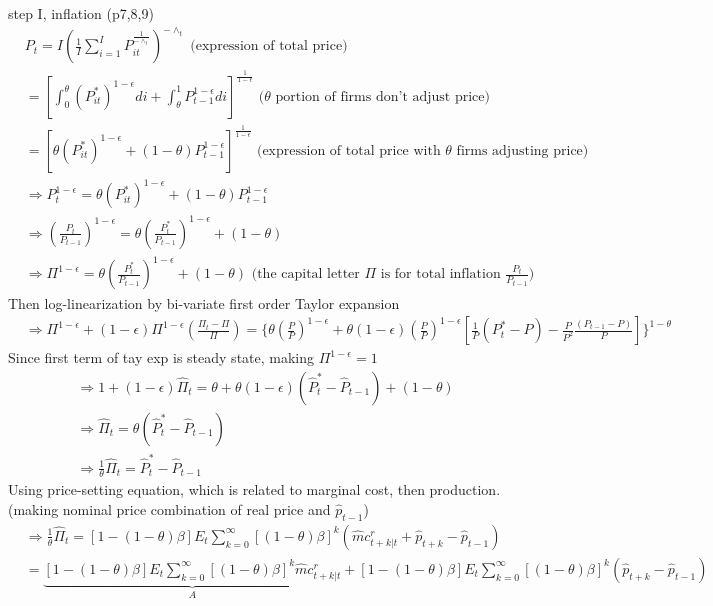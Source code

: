 \documentclass{article}
\begin{document}
step I, inflation (p7,8,9)
\begin{align}
& P_{t}=I(\frac{1}{I}\sum\limits_{i=1}^{I}P_{it}^\frac{1}{-\wedge_t})^{-\wedge_t}\text{ (expression of total price)}
\\& =[\int_{0}^{\theta} (P^{*}_{it})^{1-\epsilon}di+\int_{\theta}^{1} P_{t-1}^{1-\epsilon}di]^{ \frac{1}{1-\epsilon}}
\text{ ($\theta$ portion of firms don't adjust price)}
\\& =[\theta (P^{*}_{it})^{1-\epsilon}+(1-\theta) P_{t-1}^{1-\epsilon}]^{ \frac{1}{1-\epsilon}}
\text{ (expression of total price with $\theta$ firms adjusting price)}
\\& \Rightarrow P_t^{1-\epsilon}=\theta (P^{*}_{it})^{1-\epsilon}+(1-\theta) P_{t-1}^{1-\epsilon}
\\& \Rightarrow (\frac{P_t}{P_{t-1}})^{1-\epsilon}=\theta (\frac{P_t^*}{P_{t-1}})^{1-\epsilon}+(1-\theta) 
\\& \Rightarrow \Pi^{1-\epsilon}=\theta (\frac{P_t^*}{P_{t-1}})^{1-\epsilon}+(1-\theta) 
\text{ (the capital letter $\Pi$ is for total inflation $\frac{P_t}{P_{t-1}}$)}
\end{align}
Then log-linearization by bi-variate first order Taylor expansion
\begin{align}
& \Rightarrow \Pi^{1-\epsilon}+(1-\epsilon)\Pi^{1-\epsilon}(\frac{\Pi_t-\Pi}{\Pi})=\{\theta (\frac{P}{P})^{1-\epsilon}+\theta (1-\epsilon)(\frac{P}{P})^{1-\epsilon}[\frac{1}{P}(P^*_t-P)-\frac{P}{P^2} \frac{(P_{t-1}-P)}{P}]\}^{1-\theta}
\end{align}
Since first term of tay exp is steady state, making $\Pi^{1-\epsilon}=1$
\begin{align}
& \Rightarrow 1+(1-\epsilon)\hat \Pi_t=\theta+\theta(1-\epsilon)(\hat P_t^*-\hat P_{t-1})+(1-\theta)
\\& \Rightarrow \hat \Pi_t =\theta(\hat P_t^*-\hat P_{t-1})
\\& \Rightarrow \frac{1}{\theta}\hat \Pi_t=\hat P_t^*-\hat P_{t-1}
\end{align}
Using price-setting equation, which is related to marginal cost, then production.
(making nominal price combination of real price and $\hat p_{t-1}$)
\begin{align}
& \Rightarrow \frac{1}{\theta}\hat \Pi_t=[1-(1-\theta)\beta]E_t \sum\limits_{k=0}^{\infty}[(1-\theta)\beta]^k (\hat mc^r_{t+k|t}+\hat p_{t+k}-\hat p_{t-1})
\\& = \underbrace{[1-(1-\theta)\beta]E_t \sum\limits_{k=0}^{\infty}[(1-\theta)\beta]^k \hat mc^r_{t+k|t}}_{A} +[1-(1-\theta)\beta]E_t \sum\limits_{k=0}^{\infty}[(1-\theta)\beta]^k (\hat p_{t+k}-\hat p_{t-1} )
\end{align}
\end{document}
